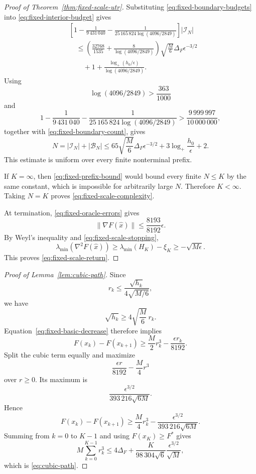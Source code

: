 \begin{proof}[Proof of Theorem~\ref{thm:fixed-scale-utr}]
Substituting
\eqref{eq:fixed-boundary-budgets} into
\eqref{eq:fixed-interior-budget} gives
\begin{align*}
    &
    \left[
        1
        -
        \frac1{9\,431\,040}
        -
        \frac{
            1
        }{
            25\,165\,824\log(4096/2849)
        }
    \right]
    |\mathcal I_N|
    \\
    &\quad\le
    \left(
        \frac{32768}{1535}
        +
        \frac8{\log(4096/2849)}
    \right)
    \sqrt{\frac M6}
    \Delta_F\epsilon^{-3/2}
    \\
    &\qquad+
    1+
    \frac{
        \log_+(h_0/\epsilon)
    }{
        \log(4096/2849)
    }.
\end{align*}
Using
\[
    \log(4096/2849)>\frac{363}{1000}
\]
and
\[
    1
    -
    \frac1{9\,431\,040}
    -
    \frac{
        1
    }{
        25\,165\,824\log(4096/2849)
    }
    >
    \frac{9\,999\,997}{10\,000\,000},
\]
together with
\eqref{eq:fixed-boundary-count}, gives
\begin{equation}
    N
    =
    |\mathcal I_N|+|\mathcal B_N|
    \le
    65\sqrt{\frac M6}
    \Delta_F\epsilon^{-3/2}
    +
    3\log_+\frac{h_0}{\epsilon}
    +2.
    \label{eq:fixed-prefix-bound}
\end{equation}
This estimate is uniform over every finite nonterminal prefix.

If $K=\infty$, then
\eqref{eq:fixed-prefix-bound} would bound every finite
$N\le K$ by the same constant, which is impossible for arbitrarily
large $N$. Therefore $K<\infty$.
Taking $N=K$ proves
\eqref{eq:fixed-scale-complexity}.

At termination,
\eqref{eq:fixed-oracle-errors} gives
\[
    \|\nabla F(\widehat x)\|
    \le
    \frac{8193}{8192}\epsilon.
\]
By Weyl's inequality and
\eqref{eq:fixed-scale-stopping},
\[
    \lambda_{\min}(\nabla^2F(\widehat x))
    \ge
    \lambda_{\min}(H_K)-\xi_K
    \ge
    -\sqrt{M\epsilon}.
\]
This proves \eqref{eq:fixed-scale-return}.
\end{proof}


\begin{proof}[Proof of Lemma~\ref{lem:cubic-path}]
Since
\[
    r_k
    \le
    \frac{\sqrt{h_k}}
         {4\sqrt{M/6}},
\]
we have
\[
    \sqrt{h_k}
    \ge
    4\sqrt{\frac M6}\,r_k.
\]
Equation~\eqref{eq:fixed-basic-decrease} therefore implies
\[
    F(x_k)-F(x_{k+1})
    \ge
    \frac M2 r_k^3
    -
    \frac{\epsilon r_k}{8192}.
\]
Split the cubic term equally and maximize
\[
    \frac{\epsilon r}{8192}
    -
    \frac M4r^3
\]
over $r\ge0$. Its maximum is
\[
    \frac{
        \epsilon^{3/2}
    }{
        393\,216\sqrt{6M}
    }.
\]
Hence
\[
    F(x_k)-F(x_{k+1})
    \ge
    \frac M4r_k^3
    -
    \frac{
        \epsilon^{3/2}
    }{
        393\,216\sqrt{6M}
    }.
\]
Summing from $k=0$ to $K-1$ and using
$F(x_K)\ge F^*$ gives
\[
    M\sum_{k=0}^{K-1}r_k^3
    \le
    4\Delta_F
    +
    \frac{K}{98\,304\sqrt6}
    \frac{\epsilon^{3/2}}{\sqrt M},
\]
which is \eqref{eq:cubic-path}.
\end{proof}


